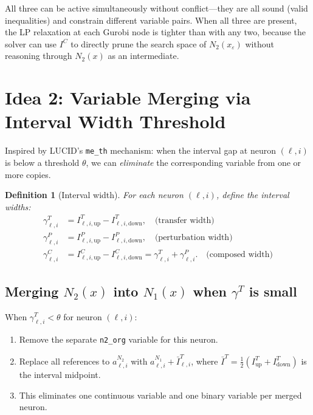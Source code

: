 \documentclass[11pt]{article}
\newcommand{\layerl}{\ell}
\newtheorem{definition}{Definition}
\begin{document}
\noindent
All three can be active simultaneously without conflict---they are all sound
(valid inequalities) and constrain different variable pairs.
When all three are present, the LP relaxation at each Gurobi node is
tighter than with any two, because the solver can use $I^C$ to directly
prune the search space of $N_2(x_\varepsilon)$ without reasoning through
$N_2(x)$ as an intermediate.


\section{Idea 2: Variable Merging via Interval Width Threshold}
\label{sec:merging}

Inspired by LUCID's \texttt{me\_th} mechanism: when the interval gap at neuron
$(\layerl, i)$ is below a threshold $\theta$, we can \emph{eliminate} the
corresponding variable from one or more copies.

\begin{definition}[Interval width]
For each neuron $(\layerl, i)$, define the interval widths:
\begin{align}
    \gamma^T_{\layerl,i} &= I^T_{\layerl,i,\text{up}} - I^T_{\layerl,i,\text{down}},
    \quad\text{(transfer width)} \\
    \gamma^P_{\layerl,i} &= I^P_{\layerl,i,\text{up}} - I^P_{\layerl,i,\text{down}},
    \quad\text{(perturbation width)} \\
    \gamma^C_{\layerl,i} &= I^C_{\layerl,i,\text{up}} - I^C_{\layerl,i,\text{down}}
                          = \gamma^T_{\layerl,i} + \gamma^P_{\layerl,i}.
    \quad\text{(composed width)}
\end{align}
\end{definition}

\subsection{Merging $N_2(x)$ into $N_1(x)$ when $\gamma^T$ is small}

When $\gamma^T_{\layerl,i} < \theta$ for neuron $(\layerl,i)$:
\begin{enumerate}
    \item Remove the separate \texttt{n2\_org} variable for this neuron.
    \item Replace all references to $a^{N_2}_{\layerl,i}$ with
          $a^{N_1}_{\layerl,i} + \bar{I}^T_{\layerl,i}$,
          where $\bar{I}^T = \frac{1}{2}(I^T_{\text{up}} + I^T_{\text{down}})$ is the interval midpoint.
    \item This eliminates one continuous variable and one binary variable per merged neuron.
\end{enumerate}
\end{document}
